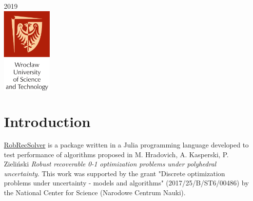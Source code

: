 \begin{titlepage}


{\large 2019}\\[0.5cm] %


\includegraphics[width=2.5cm]{logo.png} %


\vfill %

\end{titlepage}

\tableofcontents{\protect\newpage}

\section{Introduction}

\href{https://github.com/nikagra/RobRecSolver.jl}{RobRecSolver} is a package written in a Julia programming language developed to test performance of algorithms proposed in M. Hradovich, A. Kasperski, P. Zieliński \textit{Robust recoverable 0-1 optimization problems under polyhedral uncertainty}\cite{HKZ19}. This work was supported by the grant "Discrete optimization problems under uncertainty - models and algorithms" (2017/25/B/ST6/00486) by  the  National  Center  for  Science  (Narodowe
Centrum Nauki).

